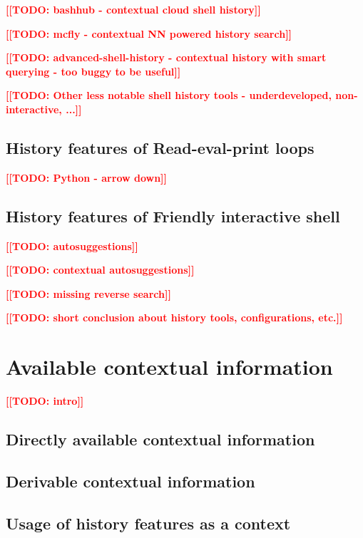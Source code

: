 \documentclass[thesis=M,english]{FITthesis}[2012/10/20]
\newcommand{\todotext}[1]{\textcolor{red}{\textbf{[[#1]]}}}
\newcommand{\blind}[1][1]{\textcolor{mygray}{\Blindtext[#1][1]}}
\begin{document}
\todotext{TODO: bashhub - contextual cloud shell history}

\todotext{TODO: mcfly - contextual NN powered history search}

\todotext{TODO: advanced-shell-history - contextual history with smart querying - too buggy to be useful}


\todotext{TODO: Other less notable shell history tools - underdeveloped, non-interactive, ...}


\subsection{History features of Read-eval-print loops}

\todotext{TODO: Python - arrow down}

\subsection{History features of Friendly interactive shell}

\todotext{TODO: autosuggestions}

\todotext{TODO: contextual autosuggestions}

\todotext{TODO: missing reverse search}


\blind[4]

\todotext{TODO: short conclusion about history tools, configurations, etc.}



\section{Available contextual information}

\todotext{TODO: intro}

\subsection{Directly available contextual information}

\blind[2]

\subsection{Derivable contextual information}

\blind[2]

\subsection{Usage of history features as a context}
\end{document}
